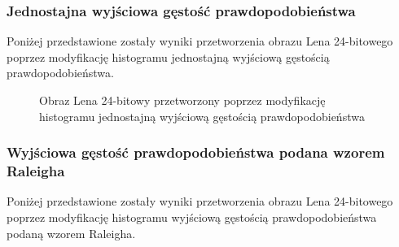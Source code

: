 \documentclass{classrep}
\begin{document}
\subsubsection{Jednostajna wyjściowa gęstość prawdopodobieństwa}
Poniżej przedstawione zostały wyniki przetworzenia obrazu Lena 24-bitowego poprzez modyfikację histogramu jednostajną wyjściową gęstością prawdopodobieństwa.

\begin{figure}[H]%
    \centering
    \qquad
    \qquad
    \qquad
    \caption{Obraz Lena 24-bitowy przetworzony poprzez modyfikację histogramu jednostajną wyjściową gęstością prawdopodobieństwa}%
\end{figure}

\subsubsection{Wyjściowa gęstość prawdopodobieństwa podana wzorem Raleigha}
Poniżej przedstawione zostały wyniki przetworzenia obrazu Lena 24-bitowego poprzez modyfikację histogramu wyjściową gęstością prawdopodobieństwa podaną wzorem Raleigha.
\end{document}
